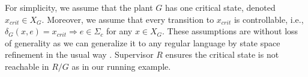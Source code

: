 For simplicity, we assume that the plant $G$ has one critical state, denoted $x_{crit} \in X_G$.
Moreover, we assume that every transition to $x_{crit}$ is controllable, i.e., $\delta_G(x,e) = x_{crit} \Rightarrow e\in \Sigma_c$ for any $x\in X_G$.
These assumptions are without loss of generality as we can generalize it to any regular language by state space refinement in the usual way \citep{Cho:1989,Lafortune:2021}. 
Supervisor $R$ ensures the critical state is not reachable in $R/G$ as in our running example.




